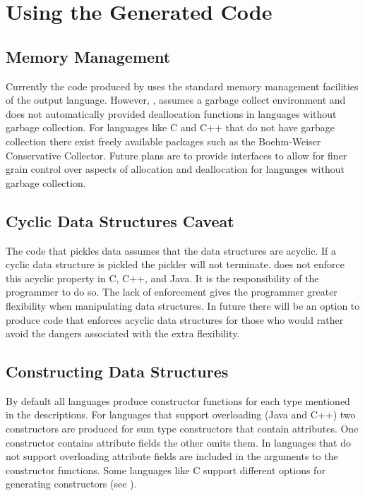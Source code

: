 %
\chapter{Using the Generated Code}
\label{sec:code-interface}

\section{Memory Management}
Currently the code produced by \asdlgen{} uses the standard memory management
facilities of the output language.
However, \asdlgen{}, assumes a garbage
collect environment and does not automatically provided deallocation
functions in languages without garbage collection.
For languages like C and
C++ that do not have garbage collection there exist freely
available packages such as the Boehm-Weiser Conservative Collector. 
Future plans are to provide interfaces to allow for finer grain
control over aspects of allocation and deallocation for languages
without garbage collection.

\section{Cyclic Data Structures Caveat}
The code that pickles data assumes that the data structures are acyclic. If
a cyclic data structure is pickled the pickler will not terminate. \asdlgen{}
does not enforce this acyclic property in C, C++, and Java. It is the
responsibility of the programmer to do so. The lack of enforcement gives the
programmer greater flexibility when manipulating data structures. In future
there will be an option to produce code that enforces acyclic data
structures for those who would rather avoid the dangers associated with the
extra flexibility.

\section{Constructing Data Structures}
By default all languages produce constructor functions for each type
mentioned in the descriptions. For languages that support overloading (Java
and C++) two constructors are produced for sum type constructors that
contain attributes.
One constructor contains attribute fields the other omits them.
In languages that do not support overloading attribute fields
are included in the arguments to the constructor functions. Some languages
like C support different options for generating constructors (see
).

